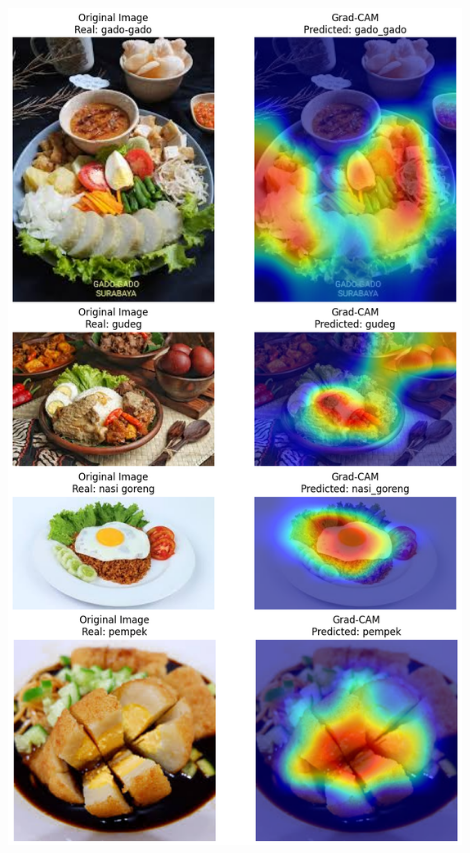 \begin{afigure}
    \includegraphics[height=0.9\textheight, width=0.9\textwidth, center]{images/grad-cam-2-dgx.png}
    \label{fig:grad-cam-2-dgx}
\end{afigure}
\clearpage
